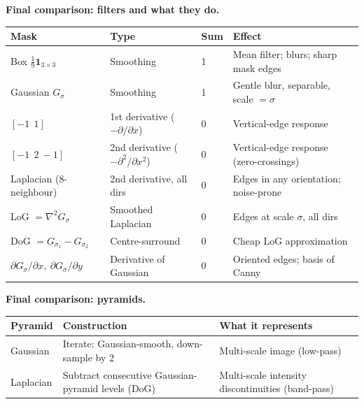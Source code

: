 \textbf{Final comparison: filters and what they do.}

\begin{center}
\renewcommand{\arraystretch}{1.3}
\begin{tabular}{@{} l l l l @{}}
\toprule
\textbf{Mask} & \textbf{Type} & \textbf{Sum} & \textbf{Effect} \\
\midrule
Box $\frac{1}{9}\mathbf{1}_{3\times 3}$ & Smoothing & 1 & Mean filter; blurs; sharp mask edges \\
Gaussian $G_\sigma$ & Smoothing & 1 & Gentle blur, separable, scale $= \sigma$ \\
$[-1\ \ 1]$ & 1st derivative ($-\partial/\partial x$) & 0 & Vertical-edge response \\
$[-1\ \ 2\ -1]$ & 2nd derivative ($-\partial^2/\partial x^2$) & 0 & Vertical-edge response (zero-crossings) \\
Laplacian (8-neighbour) & 2nd derivative, all dirs & 0 & Edges in any orientation; noise-prone \\
LoG $= \nabla^2 G_\sigma$ & Smoothed Laplacian & 0 & Edges at scale $\sigma$, all dirs \\
DoG $= G_{\sigma_1} - G_{\sigma_2}$ & Centre-surround & 0 & Cheap LoG approximation \\
$\partial G_\sigma / \partial x,\ \partial G_\sigma / \partial y$ & Derivative of Gaussian & 0 & Oriented edges; basis of Canny \\
\bottomrule
\end{tabular}
\end{center}

\textbf{Final comparison: pyramids.}

\begin{center}
\renewcommand{\arraystretch}{1.3}
\begin{tabular}{@{} l p{4.5cm} p{5.5cm} @{}}
\toprule
\textbf{Pyramid} & \textbf{Construction} & \textbf{What it represents} \\
\midrule
Gaussian & Iterate: Gaussian-smooth, down-sample by 2 & Multi-scale image (low-pass) \\
Laplacian & Subtract consecutive Gaussian-pyramid levels (DoG) & Multi-scale intensity discontinuities (band-pass) \\
\bottomrule
\end{tabular}
\end{center}
